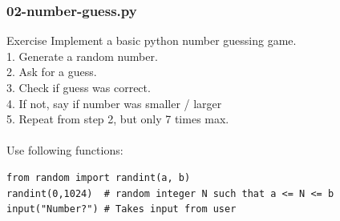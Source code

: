 \documentclass{beamer}
\begin{document}
\begin{frame}[fragile]
	\frametitle{02-number-guess.py}
	\begin{exampleblock}{Exercise}
Implement a basic python number guessing game.\\
1. Generate a random number.\\
2. Ask for a guess.\\
3. Check if guess was correct.\\
4. If not, say if number was smaller / larger\\
5. Repeat from step 2, but only 7 times max.\\
~\\
Use following functions:
		\begin{verbatim}
from random import randint(a, b)
randint(0,1024)  # random integer N such that a <= N <= b
input("Number?") # Takes input from user
		\end{verbatim}
	\end{exampleblock}
\end{frame}

\end{document}
